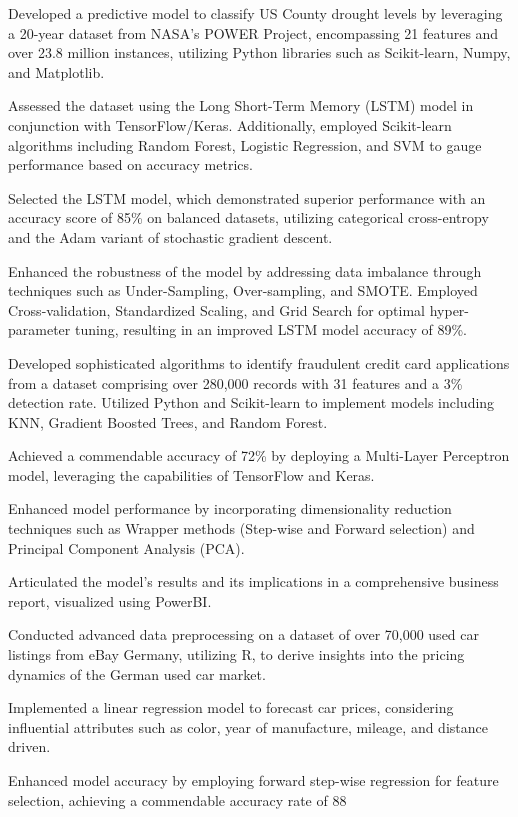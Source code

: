 
\begin{zitemize}
 \item Developed a predictive model to classify US County drought levels by leveraging a 20-year dataset from NASA's POWER Project, encompassing 21 features and over 23.8 million instances, utilizing Python libraries such as Scikit-learn, Numpy, and Matplotlib.
\item Assessed the dataset using the Long Short-Term Memory (LSTM) model in conjunction with TensorFlow/Keras. Additionally, employed Scikit-learn algorithms including Random Forest, Logistic Regression, and SVM to gauge performance based on accuracy metrics.
\item Selected the LSTM model, which demonstrated superior performance with an accuracy score of 85\% on balanced datasets, utilizing categorical cross-entropy and the Adam variant of stochastic gradient descent.
\item Enhanced the robustness of the model by addressing data imbalance through techniques such as Under-Sampling, Over-sampling, and SMOTE. Employed Cross-validation, Standardized Scaling, and Grid Search for optimal hyper-parameter tuning, resulting in an improved LSTM model accuracy of 89\%.
\end{zitemize}

\begin{zitemize}
 \item Developed sophisticated algorithms to identify fraudulent credit card applications from a dataset comprising over 280,000 records with 31 features and a 3\% detection rate. Utilized Python and Scikit-learn to implement models including KNN, Gradient Boosted Trees, and Random Forest.
\item Achieved a commendable accuracy of 72\% by deploying a Multi-Layer Perceptron model, leveraging the capabilities of TensorFlow and Keras.
\item Enhanced model performance by incorporating dimensionality reduction techniques such as Wrapper methods (Step-wise and Forward selection) and Principal Component Analysis (PCA).
\item Articulated the model's results and its implications in a comprehensive business report, visualized using PowerBI.
\end{zitemize}

\begin{zitemize}
\item Conducted advanced data preprocessing on a dataset of over 70,000 used car listings from eBay Germany, utilizing R, to derive insights into the pricing dynamics of the German used car market.
\item Implemented a linear regression model to forecast car prices, considering influential attributes such as color, year of manufacture, mileage, and distance driven.
\item Enhanced model accuracy by employing forward step-wise regression for feature selection, achieving a commendable accuracy rate of 88%
\end{zitemize}
